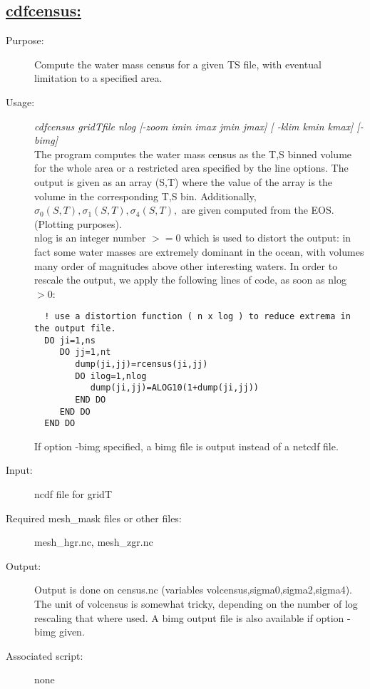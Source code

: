 \documentclass[a4paper,11pt]{article}
\begin{document}
\subsection*{\underline{cdfcensus:}}
\begin{description}
\item[Purpose:]  Compute the water mass census for a given TS file, with eventual limitation to a specified area.
\item[Usage:] {\em cdfcensus  gridTfile nlog [-zoom imin imax jmin jmax] [ -klim kmin kmax] [-bimg] }\\
    The program computes the water mass census as the T,S binned volume for the whole area or a restricted area specified 
by the line options. The output is given as an array (S,T) where the value of the array is the volume in the corresponding T,S
bin. Additionally, $\sigma_0(S,T), \sigma_1(S,T), \sigma_4(S,T),$  are given computed from the EOS. (Plotting purposes). \\
  nlog is an integer number $>=0$  which is used to distort the output: in fact some water masses are extremely dominant in the ocean, with
volumes many order of magnitudes above other interesting waters. In order to rescale the output, we apply the following lines of code, as soon
as nlog $>0$:
\begin{verbatim}
  ! use a distortion function ( n x log ) to reduce extrema in the output file.
  DO ji=1,ns
     DO jj=1,nt
        dump(ji,jj)=rcensus(ji,jj)
        DO ilog=1,nlog
           dump(ji,jj)=ALOG10(1+dump(ji,jj))
        END DO
     END DO
  END DO
\end{verbatim}
If option -bimg specified, a bimg file is output instead of a netcdf file.
\item[Input:]  ncdf file for gridT
\item[Required mesh\_mask files or other files:]  mesh\_hgr.nc, mesh\_zgr.nc
\item[Output:]  Output is done on census.nc (variables volcensus,sigma0,sigma2,sigma4). The unit of volcensus is somewhat tricky, depending on the 
  number of log rescaling that where used. A bimg output file is also available if option -bimg given.
\item[Associated script:] none
\end{description}

\newpage
\end{document}
